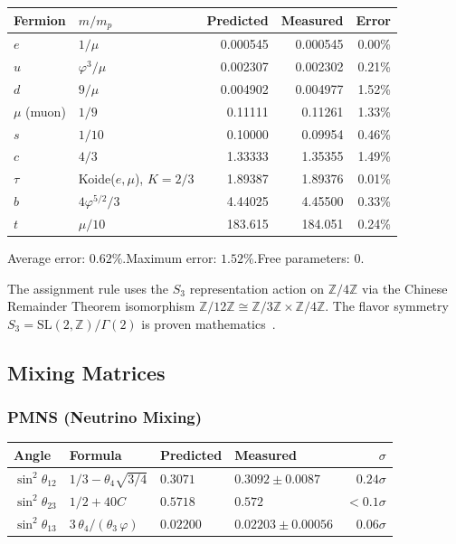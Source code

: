 \documentclass[11pt,a4paper]{article}
\newcommand{\vp}{\varphi}
\newcommand{\mpr}{m_p}
\begin{document}
\begin{center}
\begin{tabular}{@{}llrrr@{}}
\toprule
Fermion & $m/\mpr$ & Predicted & Measured & Error \\
\midrule
$e$   & $1/\mu$ & 0.000545 & 0.000545 & 0.00\% \\
$u$   & $\vp^3/\mu$ & 0.002307 & 0.002302 & 0.21\% \\
$d$   & $9/\mu$ & 0.004902 & 0.004977 & 1.52\% \\
$\mu$ (muon) & $1/9$ & 0.11111 & 0.11261 & 1.33\% \\
$s$   & $1/10$ & 0.10000 & 0.09954 & 0.46\% \\
$c$   & $4/3$ & 1.33333 & 1.35355 & 1.49\% \\
$\tau$ & Koide($e,\mu$), $K\!=\!2/3$ & 1.89387 & 1.89376 & 0.01\% \\
$b$   & $4\vp^{5/2}/3$ & 4.44025 & 4.45500 & 0.33\% \\
$t$   & $\mu/10$ & 183.615 & 184.051 & 0.24\% \\
\bottomrule
\end{tabular}
\end{center}

\noindent
Average error: $0.62\%$.\quad Maximum error: $1.52\%$.\quad Free parameters: $0$.

The assignment rule uses the $S_3$ representation action on $\mathbb{Z}/4\mathbb{Z}$
via the Chinese Remainder Theorem isomorphism
$\mathbb{Z}/12\mathbb{Z} \cong \mathbb{Z}/3\mathbb{Z}\times\mathbb{Z}/4\mathbb{Z}$.
The flavor symmetry $S_3 = \mathrm{SL}(2,\mathbb{Z})/\Gamma(2)$ is proven
mathematics~\cite{Feruglio2017}.

\subsection{Mixing Matrices}

\subsubsection{PMNS (Neutrino Mixing)}

\begin{center}
\begin{tabular}{@{}llllr@{}}
\toprule
Angle & Formula & Predicted & Measured & $\sigma$ \\
\midrule
$\sin^2\!\theta_{12}$ & $1/3 - \theta_4\sqrt{3/4}$
  & $0.3071$ & $0.3092 \pm 0.0087$ & $0.24\sigma$ \\
$\sin^2\!\theta_{23}$ & $1/2 + 40C$\;\footnotemark
  & $0.5718$ & $0.572$ & $<0.1\sigma$ \\
$\sin^2\!\theta_{13}$ & $3\,\theta_4/(\theta_3\,\vp)$
  & $0.02200$ & $0.02203 \pm 0.00056$ & $0.06\sigma$ \\
\bottomrule
\end{tabular}
\end{center}
\end{document}

